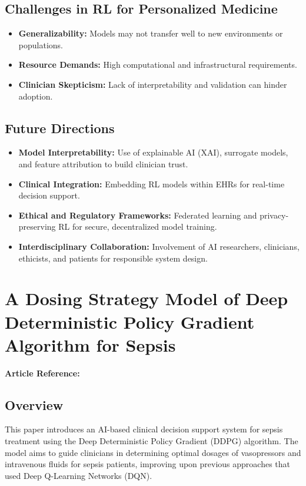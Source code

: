 \subsection*{Challenges in RL for Personalized Medicine}
\begin{itemize}
    \item \textbf{Generalizability:} Models may not transfer well to new environments or populations.
    \item \textbf{Resource Demands:} High computational and infrastructural requirements.
    \item \textbf{Clinician Skepticism:} Lack of interpretability and validation can hinder adoption.
\end{itemize}

\subsection*{Future Directions}
\begin{itemize}
    \item \textbf{Model Interpretability:} Use of explainable AI (XAI), surrogate models, and feature attribution to build clinician trust.
    \item \textbf{Clinical Integration:} Embedding RL models within EHRs for real-time decision support.
    \item \textbf{Ethical and Regulatory Frameworks:} Federated learning and privacy-preserving RL for secure, decentralized model training.
    \item \textbf{Interdisciplinary Collaboration:} Involvement of AI researchers, clinicians, ethicists, and patients for responsible system design.
\end{itemize}


\section{A Dosing Strategy Model of Deep Deterministic Policy Gradient Algorithm for Sepsis}
\textbf{Article Reference:} \cite{linDosingStrategyModel2022}

\subsection*{Overview}
This paper introduces an AI-based clinical decision support system for sepsis treatment using the Deep Deterministic Policy Gradient (DDPG) algorithm. The model aims to guide clinicians in determining optimal dosages of vasopressors and intravenous fluids for sepsis patients, improving upon previous approaches that used Deep Q-Learning Networks (DQN).

